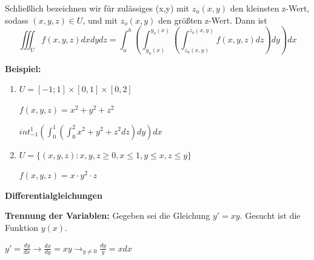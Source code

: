 \documentclass[fontset=ubuntu,12pt,a4paper,fleqn]{article}
\begin{document}
Schließlich bezeichnen wir für zulässiges (x,y) mit \(z_u(x,y)\) den kleinsten z-Wert, sodass \((x,y,z)\in U\), und mit \(z_o(x,y)\) den größten z-Wert. Dann ist \[\iiint_U f(x,y,z)dxdydz=\int_a^b \left(\int_{y_u(x)}^{y_o(x)} \left(\int_{z_u(x,y)}^{z_o(x,y)} f(x,y,z)dz\right)dy\right)dx\]

\begin{multicols}{2}
	\textbf{Beispiel:}
	\begin{enumerate}
		\item \(U=[-1;1]\times[0,1]\times[0,2]\)
		
		\(f(x,y,z)=x^2+y^2+z^2\)
		
		\(int_{-1}^1 \left(\int_0^1 \left(\int_0^2 x^2+y^2+z^2dz \right)dy \right)dx\)
		
		\item \(U=\{(x,y,z):x,y,z \ge 0,x \le 1,y \le x,z \le y\}\)
		
		\(f(x,y,z)=x\cdot y^2 \cdot z\)
	\end{enumerate}
\end{multicols}
 


\newpage















{\Large\textbf{Differentialgleichungen}\par}
\textbf{Trennung der Variablen:} 
Gegeben sei die Gleichung \(y'=xy\).
Gesucht ist die Funktion \(y(x)\).

\(y'=\frac{dy}{dx} \to \frac{dx}{dy}=xy \to_{y \ne 0} \frac{dy}{y}=xdx\)\\
\end{document}

